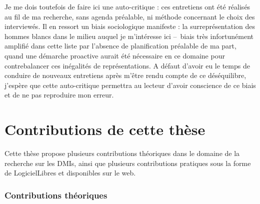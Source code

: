 \noindent Je me dois toutefois de faire ici une auto-critique : ces entretiens ont été réalisés au fil de ma recherche, sans agenda préalable, ni méthode concernant le choix des interviewés. Il en ressort un biais sociologique manifeste : la surreprésentation des hommes blancs dans le milieu auquel je m'intéresse ici --~biais très infortunément amplifié dans cette liste par l'absence de planification préalable de ma part, quand une démarche proactive aurait été nécessaire en ce domaine pour contrebalancer ces inégalités de représentations. A défaut d'avoir eu le temps de conduire de nouveaux entretiens après m'être rendu compte de ce déséquilibre, j'espère que cette auto-critique permettra au lecteur d'avoir conscience de ce biais et de ne pas reproduire mon erreur.

\section{Contributions de cette thèse}

\noindent Cette thèse propose plusieurs contributions théoriques dans le domaine de la recherche sur les \glspl{DMI}, ainsi que plusieurs contributions pratiques sous la forme de \glspl{LogicielLibre} et disponibles sur le web.

\subsubsection*{Contributions théoriques}

